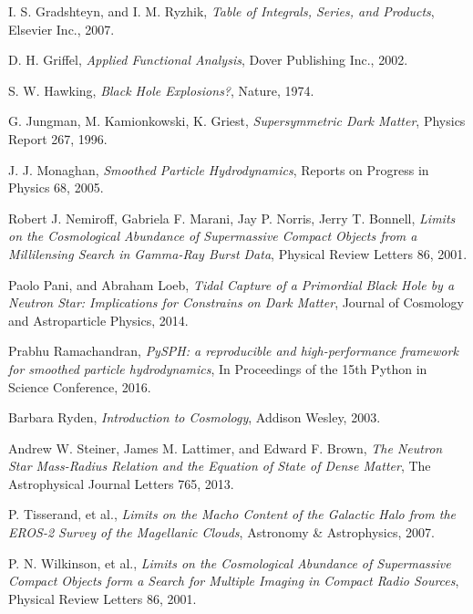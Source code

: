 \documentclass{jthesis}
\begin{document}
\begin{thebibliography}{99}
I. S. Gradshteyn, and I. M. Ryzhik, \emph{Table of Integrals, Series, and Products}, Elsevier Inc., 2007.

D. H. Griffel, \emph{Applied Functional Analysis}, Dover Publishing Inc., 2002.

S. W. Hawking, \emph{Black Hole Explosions?}, Nature, 1974.

G. Jungman, M. Kamionkowski, K. Griest, \emph{Supersymmetric Dark Matter}, Physics Report 267, 1996.

J. J. Monaghan, \emph{Smoothed Particle Hydrodynamics}, Reports on Progress in Physics 68, 2005.

Robert J. Nemiroff, Gabriela F. Marani, Jay P. Norris, Jerry T. Bonnell, \emph{Limits on the Cosmological Abundance of Supermassive Compact Objects from a Millilensing Search in Gamma-Ray Burst Data}, Physical Review Letters 86, 2001.

Paolo Pani, and Abraham Loeb, \emph{Tidal Capture of a Primordial Black Hole by a Neutron Star: Implications for Constrains on Dark Matter}, Journal of Cosmology and Astroparticle Physics, 2014.

Prabhu Ramachandran, \emph{PySPH: a reproducible and high-performance framework for smoothed particle hydrodynamics}, In Proceedings of the 15th Python in Science Conference, 2016.

Barbara Ryden, \emph{Introduction to Cosmology}, Addison Wesley, 2003.

Andrew W. Steiner, James M. Lattimer, and Edward F. Brown, \emph{The Neutron Star Mass-Radius Relation and the Equation of State of Dense Matter}, The Astrophysical Journal Letters 765, 2013.

P. Tisserand, et al., \emph{Limits on the Macho Content of the Galactic Halo from the EROS-2 Survey of the Magellanic Clouds}, Astronomy \& Astrophysics, 2007.

P. N. Wilkinson, et al., \emph{Limits on the Cosmological Abundance of Supermassive Compact Objects form a Search for Multiple Imaging in Compact Radio Sources}, Physical Review Letters 86, 2001.


\end{thebibliography}

%
%
\end{document}
